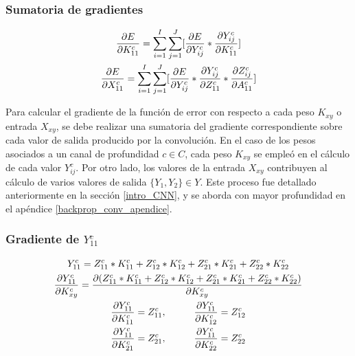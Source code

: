 \subsubsection{Sumatoria de gradientes}

\begin{gather}
	\frac{\partial E}{\partial K^c_{11}} = \sum_{i=1}^{I}\sum_{j=1}^{J}  [\frac{\partial E}{\partial Y^c_{ij}} * \frac{\partial Y^c_{ij}}{\partial K^c_{11}}] \notag \\
	\frac{\partial E}{\partial X^c_{11}} = \sum_{i=1}^{I}\sum_{j=1}^{J}  [\frac{\partial E}{\partial Y^c_{ij}} * \frac{\partial Y^c_{ij}}{\partial Z^c_{11}} * \frac{\partial Z^c_{ij}}{\partial A^c_{11}}] \notag 
\end{gather}

Para calcular el gradiente de la función de error con respecto a cada peso ${K_{xy}}$ o entrada ${X_{xy}}$, se debe realizar una sumatoria del gradiente correspondiente sobre cada valor de salida producido por la convolución. En el caso de los pesos asociados a un canal de profundidad $c \in C$, cada peso ${K_{xy}}$ se empleó en el cálculo de cada valor $Y^c_{ij}$. Por otro lado, los valores de la entrada ${X_{xy}}$ contribuyen al cálculo de varios valores de salida $\{Y_1, Y_2\} \in Y$. Este proceso fue detallado anteriormente en la sección \ref{intro_CNN}, y se aborda con mayor profundidad en el apéndice \ref{backprop_conv_apendice}.

\subsubsection{Gradiente de $Y^c_{11}$}

\begin{gather}
	Y^c_{11} = Z^c_{11} * K^c_{11} + Z^c_{12} * K^c_{12} + Z^c_{21} * K^c_{21} + Z^c_{22} * K^c_{22} \label{grad_y11_k_11} \\
	\frac{\partial Y^c_{11}}{\partial K^c_{xy}} = \frac{\partial (Z^c_{11} * K^c_{11} + Z^c_{12} * K^c_{12} + Z^c_{21} * K^c_{21} + Z^c_{22} * K^c_{22})}{\partial K^c_{xy}} \label{grad_y11_k_12} \\
	\frac{\partial Y^c_{11}}{\partial K^c_{11}} = Z^c_{11}, \hspace{10mm} \frac{\partial Y^c_{11}}{\partial K^c_{12}} = Z^c_{12} \label{grad_y11_k_21}\\
	\frac{\partial Y^c_{11}}{\partial K^c_{21}} = Z^c_{21}, \hspace{10mm} \frac{\partial Y^c_{11}}{\partial K^c_{22}} = Z^c_{22} \label{grad_y11_k_22}
\end{gather}

